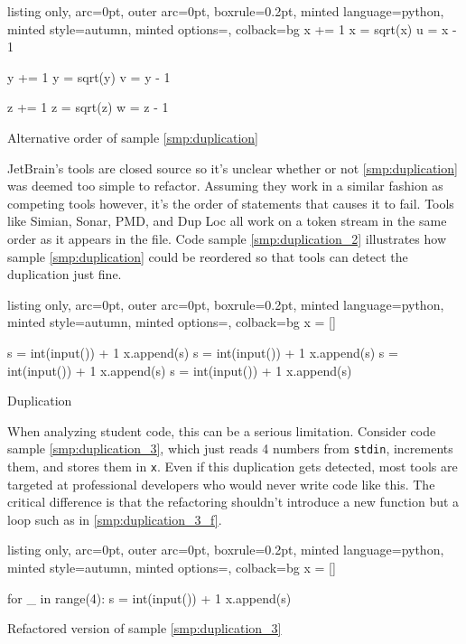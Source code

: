 \documentclass[]{article}
\begin{document}
\begin{code}
\centering
  \begin{tcblisting}{listing only, 
  arc=0pt,
  outer arc=0pt, 
  boxrule=0.2pt,
  minted language=python,
  minted style=autumn,
  minted options={},
  colback=bg }
x += 1
x = sqrt(x)
u = x - 1

y += 1
y = sqrt(y)
v = y - 1

z += 1
z = sqrt(z)
w = z - 1
\end{tcblisting}
\caption{Alternative order of sample \ref{smp:duplication}}\label{smp:duplication_2}
\end{code}

JetBrain's tools are closed source so it's unclear whether or not
\ref{smp:duplication} was deemed too simple to refactor. Assuming they
work in a similar fashion as competing tools however, it's the order of
statements that causes it to fail. Tools like Simian, Sonar, PMD, and
Dup Loc all work on a token stream in the same order as it appears in
the file. Code sample \ref{smp:duplication_2} illustrates how sample
\ref{smp:duplication} could be reordered so that tools can detect the
duplication just fine.

\begin{code}
\centering
  \begin{tcblisting}{listing only, 
  arc=0pt,
  outer arc=0pt, 
  boxrule=0.2pt,
  minted language=python,
  minted style=autumn,
  minted options={},
  colback=bg }
x = []

s = int(input()) + 1
x.append(s)
s = int(input()) + 1
x.append(s)
s = int(input()) + 1
x.append(s)
s = int(input()) + 1
x.append(s)

\end{tcblisting}
\caption{Duplication}\label{smp:duplication_3}
\end{code}

When analyzing student code, this can be a serious limitation. Consider
code sample \ref{smp:duplication_3}, which just reads 4 numbers from
\texttt{stdin}, increments them, and stores them in \texttt{x}. Even if
this duplication gets detected, most tools are targeted at professional
developers who would never write code like this. The critical difference
is that the refactoring shouldn't introduce a new function but a loop
such as in \ref{smp:duplication_3_f}.

\begin{code}
  \begin{tcblisting}{listing only, 
  arc=0pt,
  outer arc=0pt, 
  boxrule=0.2pt,
  minted language=python,
  minted style=autumn,
  minted options={},
  colback=bg }
x = []

for _ in range(4):
  s = int(input()) + 1
  x.append(s)
\end{tcblisting}
\caption{Refactored version of sample \ref{smp:duplication_3}} \label{smp:duplication_3_f}
\end{code}
\end{document}
